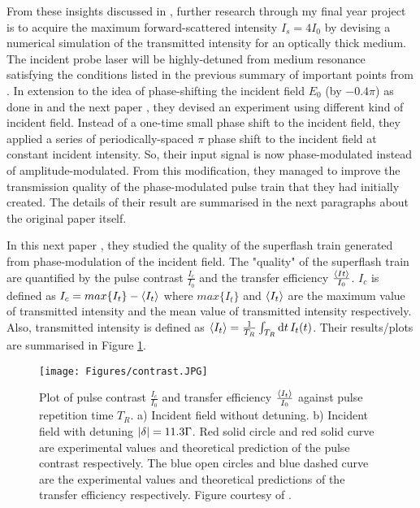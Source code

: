 From these insights discussed in \cite{Kwong2014}, further research through my final year project is to acquire the maximum forward-scattered intensity $I_{s} = 4 I_{0}$ by devising a numerical simulation of the transmitted intensity for an optically thick medium. The incident probe laser will be highly-detuned from medium resonance satisfying the conditions listed in the previous summary of important points from \cite{Kwong2014}. In extension to the idea of phase-shifting the incident field $E_{0}$ (by $-0.4\pi$) as done in \cite{Kwong2014} and the next paper \cite{Kwong2015}, they devised an experiment using different kind of incident field. Instead of a one-time small phase shift to the incident field, they applied a series of periodically-spaced $\pi$ phase shift to the incident field at constant incident intensity. So, their input signal is now phase-modulated instead of amplitude-modulated. From this modification, they managed to improve the transmission quality of the phase-modulated pulse train that they had initially created. The details of their result are summarised in the next paragraphs about the original paper \cite{Kwong2015} itself.

In this next paper \cite{Kwong2015}, they studied the quality of the superflash train generated from phase-modulation of the incident field. The "quality" of the superflash train are quantified by the pulse contrast  $\frac{I_{c}}{I_{0}}$ and the transfer efficiency $\frac{\expval{I_{}t}}{I_{0}}$. $I_{c}$ is defined as $I_{c} = max\{I_{t}\} - \expval{I_{t}}$ where $max\{I_{t}\}$ and $\expval{I_{t}}$ are the maximum value of transmitted intensity and the mean value of transmitted intensity respectively. Also, transmitted intensity is defined as $\expval{I_{t}} = \frac{1}{T_{R}} \int_{T_{R}} \dd{t} I_{t}(t)$. Their results/plots are summarised in Figure \ref{fig: contrast}.

\begin{figure}
    \centering
    \texttt{[image: Figures/contrast.JPG]}
    \caption{Plot of pulse contrast $\frac{I_{c}}{I_{0}}$ and transfer efficiency $\frac{\expval{I_{t}}}{I_{0}}$ against pulse repetition time $T_{R}$. a) Incident field without detuning. b) Incident field with detuning $\abs{\delta} = 11.3 \Gamma$. Red solid circle and red solid curve are experimental values and theoretical prediction of the pulse contrast respectively. The blue open circles and blue dashed curve are the experimental values and theoretical predictions of the transfer efficiency respectively. Figure courtesy of \protect\cite{Kwong2015}.}
    \label{fig: contrast}
\end{figure}

